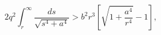 \begin{equation}
2q^2
\int^{\infty}_{r}{\frac{ds}{\sqrt{s^4+a^4}}}>b^2r^3[\sqrt{1+\frac{a^4}{r^4}}-1],
\label{ineq}
\end{equation}

